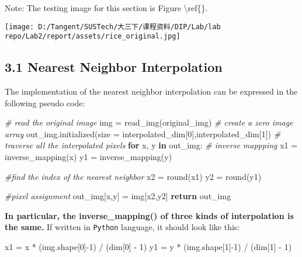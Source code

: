 \documentclass[
]{article}
\newenvironment{Shaded}{}{}
\newcommand{\BuiltInTok}[1]{\textcolor[rgb]{0.00,0.50,0.00}{#1}}
\newcommand{\CommentTok}[1]{\textcolor[rgb]{0.38,0.63,0.69}{\textit{#1}}}
\newcommand{\ControlFlowTok}[1]{\textcolor[rgb]{0.00,0.44,0.13}{\textbf{#1}}}
\newcommand{\DecValTok}[1]{\textcolor[rgb]{0.25,0.63,0.44}{#1}}
\newcommand{\KeywordTok}[1]{\textcolor[rgb]{0.00,0.44,0.13}{\textbf{#1}}}
\newcommand{\NormalTok}[1]{#1}
\newcommand{\OperatorTok}[1]{\textcolor[rgb]{0.40,0.40,0.40}{#1}}
\begin{document}
Note: The testing image for this section is Figure
\textbackslash ref\{\}.

\texttt{[image: D:/Tangent/SUSTech/大三下/课程资料/DIP/Lab/lab repo/Lab2/report/assets/rice\_original.jpg]}

\hypertarget{31-nearest-neighbor-interpolation}{%
\subsection{3.1 Nearest Neighbor
Interpolation}\label{31-nearest-neighbor-interpolation}}

The implementation of the nearest neighbor interpolation can be
expressed in the following pseudo code:

\begin{Shaded}
\begin{Highlighting}[]
\CommentTok{\# read the original image}
\NormalTok{img }\OperatorTok{=}\NormalTok{ read\_img(original\_img)}
\CommentTok{\# create a zero image array}
\NormalTok{out\_img.initialized(size }\OperatorTok{=}\NormalTok{ interpolated\_dim[}\DecValTok{0}\NormalTok{],interpolated\_dim[}\DecValTok{1}\NormalTok{])}
\CommentTok{\# traverse all the interpolated pixels}
\ControlFlowTok{for}\NormalTok{ x, y }\KeywordTok{in}\NormalTok{ out\_img:}
	\CommentTok{\# inverse mappping}
\NormalTok{	x1 }\OperatorTok{=}\NormalTok{ inverse\_mapping(x)}
\NormalTok{	y1 }\OperatorTok{=}\NormalTok{ inverse\_mapping(y)}

	\CommentTok{\#find the index of the nearest neighbor}
\NormalTok{	x2 }\OperatorTok{=} \BuiltInTok{round}\NormalTok{(x1)}
\NormalTok{	y2 }\OperatorTok{=} \BuiltInTok{round}\NormalTok{(y1)}
	
	\CommentTok{\#pixel assignment}
\NormalTok{	out\_img[x,y] }\OperatorTok{=}\NormalTok{ img[x2,y2]}
\ControlFlowTok{return}\NormalTok{ out\_img}
	
\end{Highlighting}
\end{Shaded}

\textbf{In particular, the inverse\_mapping() of three kinds of
interpolation is the same.} If written in \texttt{Python} language, it
should look like this:

\begin{Shaded}
\begin{Highlighting}[]
\NormalTok{x1 }\OperatorTok{=}\NormalTok{ x }\OperatorTok{*}\NormalTok{ (img.shape[}\DecValTok{0}\NormalTok{]}\OperatorTok{{-}}\DecValTok{1}\NormalTok{) }\OperatorTok{/}\NormalTok{ (dim[}\DecValTok{0}\NormalTok{] }\OperatorTok{{-}} \DecValTok{1}\NormalTok{)}
\NormalTok{y1 }\OperatorTok{=}\NormalTok{ y }\OperatorTok{*}\NormalTok{ (img.shape[}\DecValTok{1}\NormalTok{]}\OperatorTok{{-}}\DecValTok{1}\NormalTok{) }\OperatorTok{/}\NormalTok{ (dim[}\DecValTok{1}\NormalTok{] }\OperatorTok{{-}} \DecValTok{1}\NormalTok{)}
\end{Highlighting}
\end{Shaded}
\end{document}
